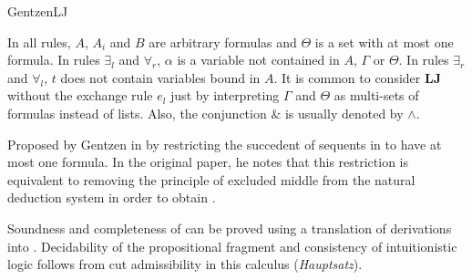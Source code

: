 \begin{entry}{GentzenLJ}

\begin{clarifications}
In all rules, $A$, $A_i$ and $B$ are arbitrary formulas and $\Theta$ is a set
with at most one formula. In rules $\exists_l$
and $\forall_r$, $\alpha$ is a variable not contained in $A$, $\Gamma$ or
$\Theta$. In rules $\exists_r$ and $\forall_l$, $t$ does not contain variables
bound in $A$.
It is common to consider \textbf{LJ} without the exchange rule $e_l$ just by
interpreting $\Gamma$ and $\Theta$ as multi-sets of formulas instead of lists.
Also, the conjunction $\&$ is usually denoted by $\wedge$.
\end{clarifications}

\begin{history}
Proposed by Gentzen in \cite{Gentzen1935} by restricting the
succedent of sequents in  to have at most one
formula. In the original paper, he notes that this restriction is equivalent to
removing the principle of excluded middle from the natural deduction system
 in order to obtain .
\end{history}

\begin{technicalities}
Soundness and completeness of \LJ can be proved using a translation of \LJ
derivations into \NJ{}.
Decidability of the propositional fragment and consistency of intuitionistic
logic follows from cut admissibility in this calculus (\emph{Hauptsatz}).
\end{technicalities}





\end{entry}
